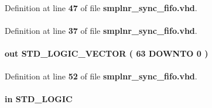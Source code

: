 Definition at line {\bf 47} of file {\bf smplnr\+\_\+sync\+\_\+fifo.\+vhd}.

\paragraph[{ieee}]{\hspace{0.3cm}{\ttfamily [Library]}}\label{classsmplnr__sync__fifo_a0a6af6eef40212dbaf130d57ce711256}


Definition at line {\bf 37} of file {\bf smplnr\+\_\+sync\+\_\+fifo.\+vhd}.

\paragraph[{q}]{ {\bfseries \textcolor{keywordflow}{out}\textcolor{vhdlchar}{ }} {\bfseries \textcolor{comment}{S\+T\+D\+\_\+\+L\+O\+G\+I\+C\+\_\+\+V\+E\+C\+T\+OR}\textcolor{vhdlchar}{ }\textcolor{vhdlchar}{(}\textcolor{vhdlchar}{ }\textcolor{vhdlchar}{ } \textcolor{vhdldigit}{63} \textcolor{vhdlchar}{ }\textcolor{keywordflow}{D\+O\+W\+N\+TO}\textcolor{vhdlchar}{ }\textcolor{vhdlchar}{ } \textcolor{vhdldigit}{0} \textcolor{vhdlchar}{ }\textcolor{vhdlchar}{)}\textcolor{vhdlchar}{ }} \hspace{0.3cm}{\ttfamily [Port]}}\label{classsmplnr__sync__fifo_aae9b560b72c6164b8cd12b2c3fc0abcc}


Definition at line {\bf 52} of file {\bf smplnr\+\_\+sync\+\_\+fifo.\+vhd}.

\paragraph[{rdclk}]{ {\bfseries \textcolor{keywordflow}{in}\textcolor{vhdlchar}{ }} {\bfseries \textcolor{comment}{S\+T\+D\+\_\+\+L\+O\+G\+IC}\textcolor{vhdlchar}{ }} \hspace{0.3cm}{\ttfamily [Port]}}\label{classsmplnr__sync__fifo_a463d5fc49d1826e964692ab15a4459e5}


